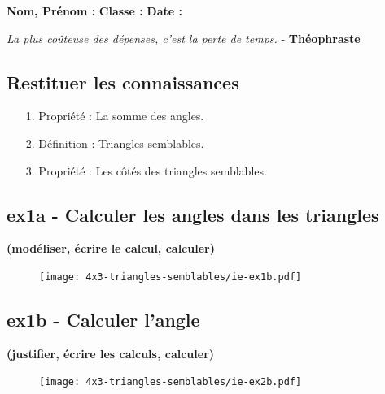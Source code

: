 \newpage

\textbf{Nom, Prénom :} \hspace{8cm} \textbf{Classe :} \hspace{3cm} \textbf{Date :}\\

\begin{center}
  \textit{La plus coûteuse des dépenses, c’est la perte de temps.}  - \textbf{Théophraste}
\end{center}

\subsection*{Restituer les connaissances}

\begin{enumerate}
  \item[1.] Propriété : La somme des angles. \newline \Pointilles[1]
  \item[2.] Définition : Triangles semblables. \newline \Pointilles[1]
  \item[3.] Propriété : Les côtés des triangles semblables. \newline \Pointilles[1]
\end{enumerate}

\subsection*{ex1a - Calculer les angles dans les triangles}
\textbf{(modéliser, écrire le calcul, calculer)}

\begin{figure}[H]
  \centering
  \texttt{[image: 4x3-triangles-semblables/ie-ex1b.pdf]}
\end{figure}
\Pointilles[2]

\begin{minipage}[t]{0.55\textwidth}
  \subsection*{ex1b - Calculer l'angle}
  \textbf{(justifier, écrire les calculs, calculer)}
  \Pointilles[6]
\end{minipage}
\begin{minipage}[t]{0.4\textwidth}
  \begin{figure}[H]
    \centering
    \texttt{[image: 4x3-triangles-semblables/ie-ex2b.pdf]}
  \end{figure}
\end{minipage}

